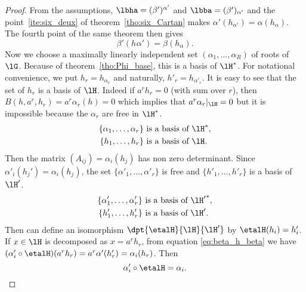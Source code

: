 \begin{proof}
	From the assumptions, $\lbha=(\beta')^{\alpha'}$ and $\lbba=(\beta')_{\alpha'}$ and the point~\ref{ite:six_deux} of theorem~\ref{tho:six_Cartan} makes $\alpha'(h_{\alpha'})=\alpha(h_{\alpha})$. The fourth point of the same theorem then gives
	\begin{equation}\label{eq:beta_h_beta}
		\beta'(h_{}\alpha')=\beta(h_{\alpha}).
	\end{equation}
	Now we choose a maximally linearly independent set $(\alpha_1,\ldots,\alpha_R)$ of roots of $\lG$. Because of theorem~\ref{tho:Phi_base}, this is a basis of $\lH^*$. For notational convenience, we put $h_r=h_{\alpha_r}$ and naturally, $h'_r=h_{\alpha'_r}$. It is easy to see that the set of $h_r$ is a basis of $\lH$. Indeed if $a^rh_r=0$ (with sum over $r$), then $B(h,a^r,h_r)=a^r\alpha_r(h)=0$ which implies that $a^r\alpha_r|_{\lH}=0$ but it is impossible because the $\alpha_r$ are free in $\lH^*$.
	\begin{equation*}
		\begin{split}
			\{ \alpha_1,\ldots,\alpha_r \}&\textrm{ is a basis of $\lH^*$},\\
			\{ h_1,\ldots,h_r \}&\textrm{ is a basis of $\lH$}.
		\end{split}
	\end{equation*}
	Then the matrix $(A_{ij})=\alpha_i(h_j)$ has non zero determinant. Since $\alpha'_i(h_j')=\alpha_i(h_j)$, the set $\{\alpha'_1,\ldots,\alpha'_r\}$ is free and $\{h'_1,\ldots,h'_r\}$ is a basis of $\lH'$.
	\begin{equation*}
		\begin{split}
			\{ \alpha'_1,\ldots,\alpha'_r \}&\textrm{ is a basis of ${\lH'}^*$},\\
			\{ h'_1,\ldots,h'_r \}&\textrm{ is a basis of $\lH'$}.
		\end{split}
	\end{equation*}
	Then can define an isomorphism $\dpt{\etalH}{\lH}{\lH'}$ by $\etalH(h_i)=h'_i$. If $x\in\lH$ is decomposed as $x=a^rh_r$, from equation \eqref{eq:beta_h_beta} we have $(\alpha'_i\circ\etalH)(a^rh_r)=a^r\alpha'(h'_r)=\alpha_i(h_r)$. Then
	\[
		\alpha'_i\circ\etalH=\alpha_i.
	\]


\end{proof}
